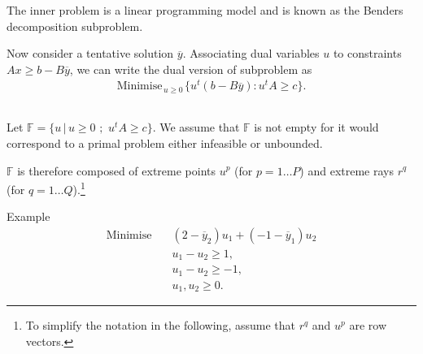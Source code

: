 The inner problem is a linear programming model and is known as the Benders decomposition subproblem.

\vfill

Now consider a tentative solution $\overline{y}$. Associating dual variables $u$ to constraints $Ax \geq
b-B\overline{y}$, we can write the dual version of  subproblem as
\begin{eqnarray*}
\label{bd3}  \textrm{Minimise}_{\, u\geq 0 \,} \{ u^t(b-B\overline{y}) :
u^tA \geq c\}.
\end{eqnarray*}

\vfill


\newpage

\subsection*{}

Let  $\mathbb{F} = \{ u \, |\, u \geq 0 \,\, ; \, \, u^tA \geq c \}$.  We assume that $\mathbb{F}$ is not empty for it would correspond to a primal problem either infeasible or
unbounded. 

$\mathbb{F}$ is therefore composed of extreme points $u^p$ (for
$p=1 \dots P$) and extreme rays $r^q$ (for $q=1 \dots Q$).\footnote{To simplify the notation in the following, assume that $r^q$ and $u^p$ are row vectors.}\\


\begin{bclogo}[logo=\bccrayon]{\small Example }
\small \vspace{-.5cm}
\begin{align*}
\textrm{Minimise} \quad &  (2-\overline{y}_2)u_1 + (-1 - \overline{y}_1)u_2 \\
& u_1 -  u_2  \geq 1, \\
& u_1 -u_2 \geq -1, \\
& u_1, u_2 \geq 0.
\end{align*}

\end{bclogo}




\begin{center}
\end{center}


